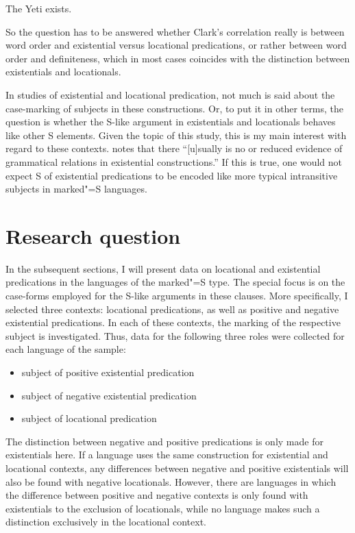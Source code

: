 \begin{exe}\ex\label{Yeti}The Yeti exists.
\end{exe} 

So the question has to be answered whether Clark's correlation really is between word order and existential versus locational predications, or rather between word order and definiteness, which in most cases coincides with the distinction between existentials and locationals.

In studies of existential and locational predication, not much is said about the case-marking of subjects in these constructions. 
Or, to put it in other terms, the question is whether the S-like argument in existentials and locationals behaves like other S elements. 
Given the topic of this study, this is my main interest with regard to these contexts.
\citet[123]{Payne:1997} notes that there ``[u]sually is no or reduced evidence of grammatical relations in existential constructions.''
If this is true, one would not expect S of existential predications to be encoded like more typical intransitive subjects in marked"=S languages.  


\section{Research question}\label{dataexist}

In the subsequent sections, I will present data on locational and existential predications in the languages of the marked"=S type. 
The special focus is on the case-forms employed for the S-like arguments in these clauses. 
More specifically, I selected three contexts: locational predications, as well as positive and negative existential predications. 
In each of these contexts, the marking of the respective subject is investigated. Thus, data for the following three roles were collected for each language of the sample:

\begin{itemize}
\item subject of positive existential predication
\item subject of negative existential predication
\item subject of locational predication
\end{itemize}

The distinction between negative and positive predications is only made for existentials here.
If a language uses the same construction for existential and locational contexts, any differences between negative and positive existentials will also be found with negative locationals. 
However, there are languages in which the difference between positive and negative contexts is only found with existentials to the exclusion of locationals, while no language makes such a distinction exclusively in the locational context. %

